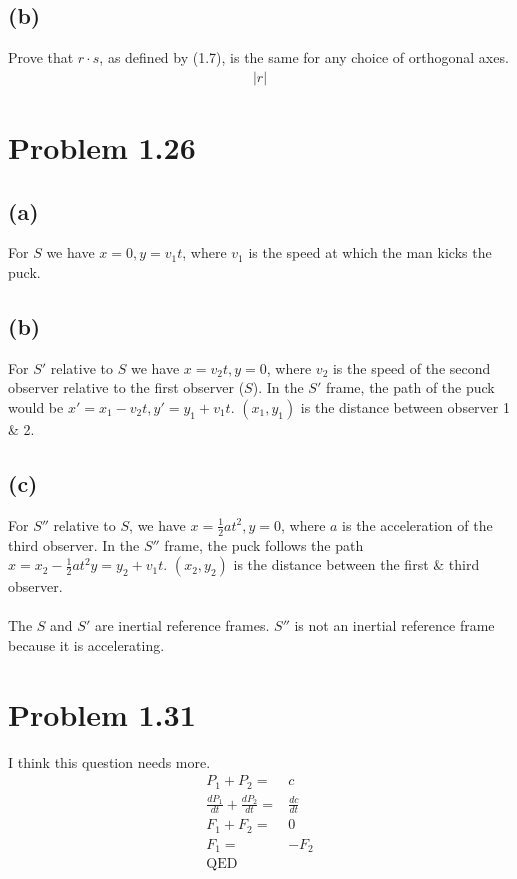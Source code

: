 \documentclass[12pt, a4paper]{article}
\begin{document}
\subsection*{(b)}
Prove that $r\cdot s$, as defined by (1.7), is the same for any choice of orthogonal axes. 
\begin{align*}
|r|
\end{align*}





\section*{Problem 1.26}
\subsection*{(a)}
For $S$ we have $x=0, y=v_1t$, where $v_1$ is the speed at which the man kicks the puck.
\subsection*{(b)}
For $S'$ relative to $S$ we have $x=v_2t, y=0$, where $v_2$ is the speed of the second observer relative to the first observer ($S$). In the $S'$ frame, the path of the puck would be $x'= x_1-v_2t, y'=y_1 +v_1t$. $(x_1, y_1)$ is the distance between observer 1 \& 2. 
\subsection*{(c)}
For $S''$ relative to $S$, we have $x=\tfrac{1}{2}at^2, y=0$, where $a$ is the acceleration of the third observer. In the $S''$ frame, the puck follows the path $x=x_2-\tfrac{1}{2}at^2 y=y_2+v_1t$. $(x_2,y_2)$ is the distance between the first \& third observer.\\
\\
The $S$ and $S'$ are inertial reference frames. $S''$ is not an inertial reference frame because it is accelerating.





\section*{Problem 1.31}
I think this question needs more. 
\begin{align*}
P_1 + P_2 =& c
\\
\frac{dP_1}{dt} + \frac{dP_2}{dt} =& \frac{dc}{dt}
\\
F_1 + F_2 =& 0
\\
F_1 =& - F_2
\\
\text{QED}
\end{align*}
\end{document}
